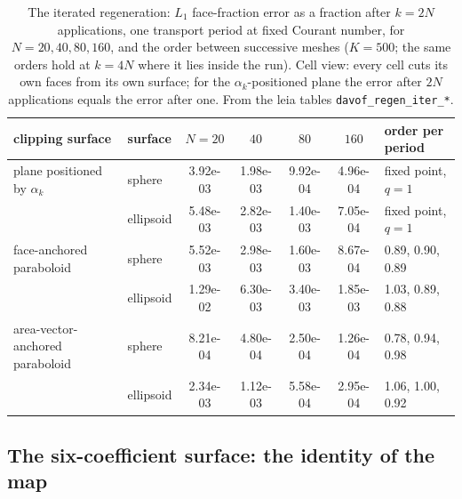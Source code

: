 \documentclass[preprint,12pt]{elsarticle}
\begin{document}
\begin{table}[htbp]
\centering
\caption{The iterated regeneration: $L_1$ face-fraction error as a fraction after $k = 2N$ applications, one transport period at fixed Courant number, for $N = 20, 40, 80, 160$, and the order between successive meshes ($K = 500$; the same orders hold at $k = 4N$ where it lies inside the run). Cell view: every cell cuts its own faces from its own surface; for the $\alpha_k$-positioned plane the error after $2N$ applications equals the error after one. From the leia tables \texttt{davof\_regen\_iter\_*}.}
\label{tab:iterated}
\footnotesize
\setlength{\tabcolsep}{4pt}
\begin{tabular}{llccccl}
\toprule
clipping surface & surface & $N = 20$ & $40$ & $80$ & $160$ & order per period \\
\midrule
plane positioned by $\alpha_k$ & sphere & 3.92e-03 & 1.98e-03 & 9.92e-04 & 4.96e-04 & fixed point, $q = 1$ \\
 & ellipsoid & 5.48e-03 & 2.82e-03 & 1.40e-03 & 7.05e-04 & fixed point, $q = 1$ \\
face-anchored paraboloid & sphere & 5.52e-03 & 2.98e-03 & 1.60e-03 & 8.67e-04 & 0.89, 0.90, 0.89 \\
 & ellipsoid & 1.29e-02 & 6.30e-03 & 3.40e-03 & 1.85e-03 & 1.03, 0.89, 0.88 \\
area-vector-anchored paraboloid & sphere & 8.21e-04 & 4.80e-04 & 2.50e-04 & 1.26e-04 & 0.78, 0.94, 0.98 \\
 & ellipsoid & 2.34e-03 & 1.12e-03 & 5.58e-04 & 2.95e-04 & 1.06, 1.00, 0.92 \\
\bottomrule
\end{tabular}
\end{table}

\subsection{The six-coefficient surface: the identity of the map}
\label{sec:full}
\end{document}
